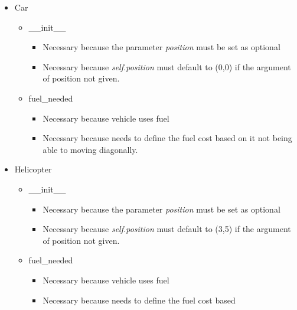\documentclass[12pt]{article}
\begin{document}
\begin{enumerate}[a.]
\begin{mdframed}
        \begin{itemize}
            \item Car
            \begin{itemize}
                \color{red}
                \item \_\_init\_\_
                \begin{itemize}
                    \item Necessary because the parameter \textit{position} must be
                    set as optional
                    \item Necessary because \textit{self.position} must default
                    to (0,0) if the argument of position not given.
                \end{itemize}
                \color{black}
                \item fuel\_needed
                \color{red}
                \begin{itemize}
                    \item Necessary because vehicle uses fuel
                    \item Necessary because needs to define the fuel cost based
                    on it not being able to moving diagonally.
                \end{itemize}
                \color{black}
            \end{itemize}
            \item Helicopter
            \begin{itemize}
                \color{red}
                \item \_\_init\_\_
                \begin{itemize}
                    \item Necessary because the parameter \textit{position} must be
                    set as optional
                    \item Necessary because \textit{self.position} must default
                    to (3,5) if the argument of position not given.
                \end{itemize}
                \color{black}
                \item fuel\_needed
                \color{red}
                \begin{itemize}
                    \item Necessary because vehicle uses fuel
                    \item Necessary because needs to define the fuel cost based

\end{itemize}
\end{itemize}
\end{itemize}
\end{mdframed}
\end{enumerate}
\end{document}

